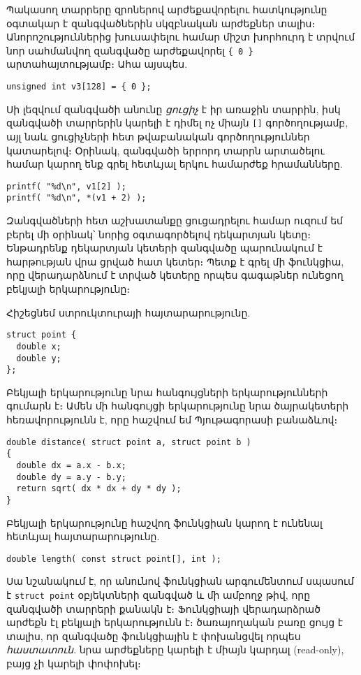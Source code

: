 Պակասող տարրերը զրոներով արժեքավորելու հատկությունը օգտակար է զանգվածներին
սկզբնական արժեքներ տալիս։ Անորոշություններից խուսափելու համար միշտ խորհուրդ
է տրվում նոր սահմանվող զանգվածը արժեքավորել \Verb|{ 0 }| արտահայտությամբ։
Ահա այսպես.

\begin{Verbatim}
unsigned int v3[128] = { 0 };
\end{Verbatim}


Սի լեզվում զանգվածի անունը \emph{ցուցիչ} է իր առաջին տարրին, իսկ զանգվածի
տարրերին կարելի է դիմել ոչ միայն \Verb|[]| գործողությամբ, այլ նաև ցուցիչների
հետ թվաբանական գործողություններ կատարելով։ Օրինակ,  զանգվածի
երրորդ տարրն արտածելու համար կարող ենք գրել հետևյալ երկու համարժեք հրամանները.

\begin{Verbatim}
printf( "%d\n", v1[2] );
printf( "%d\n", *(v1 + 2) );
\end{Verbatim}


Զանգվածների հետ աշխատանքը ցուցադրելու համար ուզում եմ բերել մի օրինակ՝
նորից օգտագործելով դեկարտյան կետը։ Ենթադրենք դեկարտյան կետերի 
զանգվածը պարունակում է հարթության վրա ցրված  հատ կետեր։ Պետք է
գրել մի ֆունկցիա, որը վերադարձնում է տրված կետերը որպես գագաթներ ունեցող
բեկյալի երկարությունը։

Հիշեցնեմ  ստրուկտուրայի հայտարարությունը.

\begin{Verbatim}
struct point {
  double x;
  double y;
};
\end{Verbatim}

Բեկյալի երկարությունը նրա հանգույցների երկարությունների գումարն է։ Ամեն
մի հանգույցի երկարությունը նրա ծայրակետերի հեռավորությունն է, որը հաշվում
եմ Պյութագորասի բանաձևով։

\begin{Verbatim}
double distance( struct point a, struct point b )
{
  double dx = a.x - b.x;
  double dy = a.y - b.y;
  return sqrt( dx * dx + dy * dy );
}
\end{Verbatim}

Բեկյալի երկարությունը հաշվող  ֆունկցիան կարող է ունենալ
հետևյալ հայտարարությունը.

\begin{Verbatim}
double length( const struct point[], int );
\end{Verbatim}

Սա նշանակում է, որ  անունով ֆունկցիան արգումենտում սպասում
է \texttt{struct point} օբյեկտների զանգված և մի ամբողջ թիվ, որը զանգվածի
տարրերի քանակն է։ Ֆունկցիայի վերադարձրած  արժեքն էլ բեկյալի
երկարությունն է։  ծառայողական բառը ցույց է տալիս, որ զանգվածը
ֆունկցիային է փոխանցվել որպես \emph{հաստատուն}. նրա արժեքները կարելի է
միայն կարդալ (read-only), բայց չի կարելի փոփոխել։

